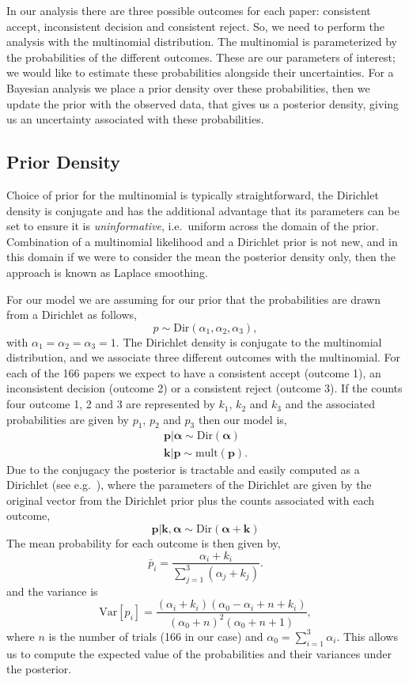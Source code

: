 In our analysis there are three possible outcomes for each paper:
consistent accept, inconsistent decision and consistent reject. So, we
need to perform the analysis with the
multinomial
distribution. The multinomial is parameterized by the probabilities of
the different outcomes. These are our parameters of interest; we would
like to estimate these probabilities alongside their uncertainties. For 
a Bayesian analysis we place a prior density over these
probabilities, then we update the prior with the observed data, that
gives us a posterior density, giving us an uncertainty associated with
these probabilities.

\subsection{Prior Density}\label{prior-density}

Choice of prior for the multinomial is typically straightforward, the Dirichlet
density is
conjugate and has
the additional advantage that its parameters can be set to ensure it is
\emph{uninformative}, i.e.~uniform across the domain of the prior.
Combination of a multinomial likelihood and a Dirichlet prior is not
new, and in this domain if we were to consider the mean the posterior
density only, then the approach is known as
Laplace
smoothing.

For our model we are assuming for our prior that the probabilities are
drawn from a Dirichlet as follows, 
\[
p \sim \text{Dir}(\alpha_1, \alpha_2, \alpha_3),
\] 
with \(\alpha_1=\alpha_2=\alpha_3=1\). The Dirichlet density is
conjugate to the
multinomial
distribution, and we associate three different outcomes with the
multinomial. For each of the 166 papers we expect to have a consistent
accept (outcome 1), an inconsistent decision (outcome 2) or a consistent
reject (outcome 3). If the counts four outcome 1, 2 and 3 are
represented by \(k_1\), \(k_2\) and \(k_3\) and the associated
probabilities are given by \(p_1\), \(p_2\) and \(p_3\) then our model
is, \begin{align*}
\mathbf{p}|\boldsymbol{\alpha} \sim \text{Dir}(\boldsymbol{\alpha}) \\
\mathbf{k}|\mathbf{p} \sim \text{mult}(\mathbf{p}).
\end{align*} Due to the conjugacy the posterior is tractable and easily
computed as a Dirichlet (see
e.g.~\cite{Gelman-bayesian13}),
where the parameters of the Dirichlet are given by the original vector
from the Dirichlet prior plus the counts associated with each outcome,
\[
\mathbf{p}|\mathbf{k}, \boldsymbol{\alpha} \sim \text{Dir}(\boldsymbol{\alpha} + \mathbf{k})
\] The mean probability for each outcome is then given by, \[
\bar{p}_i = \frac{\alpha_i+k_i}{\sum_{j=1}^3(\alpha_j + k_j)}.
\] and the variance is \[
\mathrm{Var}[p_i] = \frac{(\alpha_i+k_i) (\alpha_0-\alpha_i + n + k_i)}{(\alpha_0+n)^2 (\alpha_0+n+1)},
\] where \(n\) is the number of trials (166 in our case) and
\(\alpha_0 = \sum_{i=1}^3\alpha_i\). This allows us to compute the
expected value of the probabilities and their variances under the
posterior.

